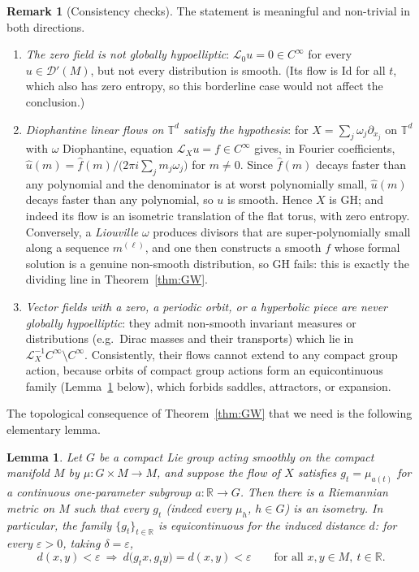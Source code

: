 \documentclass[11pt]{article}
\newtheorem{lemma}[theorem]{Lemma}
\theoremstyle{definition}
\newtheorem{remark}[theorem]{Remark}
\newcommand{\calL}{\mathcal{L}}
\newcommand{\TT}{\mathbb{T}}
\newcommand{\RR}{\mathbb{R}}
\newcommand{\Id}{\mathrm{Id}}
\begin{document}
\begin{remark}[Consistency checks]\label{rem:checks}
The statement is meaningful and non-trivial in both directions.
\begin{enumerate}[label=(\alph*), leftmargin=2.5em]
  \item \emph{The zero field is not globally hypoelliptic}: $\calL_0 u =
        0 \in C^\infty$ for every $u \in \mathcal{D}'(M)$, but not every
        distribution is smooth. (Its flow is $\Id$ for all $t$, which
        also has zero entropy, so this borderline case would not affect
        the conclusion.)
  \item \emph{Diophantine linear flows on $\TT^d$ satisfy the
        hypothesis}: for $X = \sum_j \omega_j \partial_{x_j}$ on
        $\TT^d$ with $\omega$ Diophantine, equation
        $\calL_X u = f \in C^\infty$ gives, in Fourier coefficients,
        $\hat u(m) = \hat f(m)\big/\big(2\pi i \sum_j m_j
        \omega_j\big)$ for $m \neq 0$. Since $\hat f(m)$ decays faster
        than any polynomial and the denominator is at worst polynomially
        small, $\hat u(m)$ decays faster than any polynomial, so $u$ is
        smooth. Hence $X$ is GH; and indeed its flow is an isometric
        translation of the flat torus, with zero entropy. Conversely, a
        \emph{Liouville} $\omega$ produces divisors that are
        super-polynomially small along a sequence $m^{(\ell)}$, and one
        then constructs a smooth $f$ whose formal solution is a genuine
        non-smooth distribution, so GH fails: this is exactly the
        dividing line in Theorem~\ref{thm:GW}.
  \item \emph{Vector fields with a zero, a periodic orbit, or a
        hyperbolic piece are never globally hypoelliptic}: they admit
        non-smooth invariant measures or distributions (e.g.\ Dirac
        masses and their transports) which lie in
        $\calL_X^{-1}C^\infty \setminus C^\infty$. Consistently, their
        flows cannot extend to any compact group action, because orbits
        of compact group actions form an equicontinuous family
        (Lemma~\ref{lem:equicont} below), which forbids saddles,
        attractors, or expansion.
\end{enumerate}
\end{remark}

The topological consequence of Theorem~\ref{thm:GW} that we need is the
following elementary lemma.

\begin{lemma}\label{lem:equicont}
Let $G$ be a compact Lie group acting smoothly on the compact manifold
$M$ by $\mu : G \times M \to M$, and suppose the flow of $X$ satisfies
$g_t = \mu_{a(t)}$ for a continuous one-parameter subgroup
$a : \RR \to G$. Then there is a Riemannian metric on $M$ such that every
$g_t$ \textup{(}indeed every $\mu_h$, $h \in G$\textup{)} is an isometry.
In particular, the family $\{g_t\}_{t \in \RR}$ is equicontinuous for the
induced distance $d$: for every $\varepsilon > 0$, taking
$\delta = \varepsilon$,
\[
d(x,y) < \varepsilon \ \Longrightarrow\
d\big(g_t x, g_t y\big) = d(x, y) < \varepsilon
\qquad\text{for all } x,y \in M,\ t \in \RR .
\]
\end{lemma}
\end{document}
